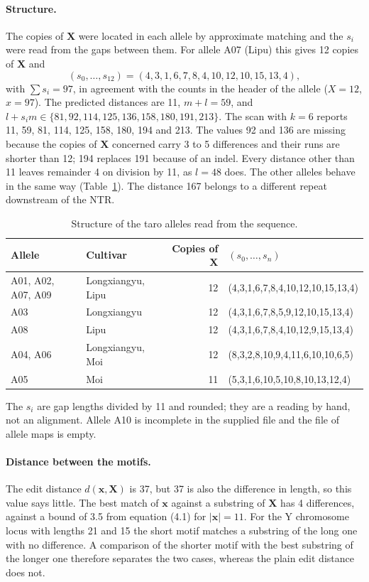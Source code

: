 \documentclass[11pt,a4paper]{article}
\begin{document}
\paragraph{Structure.} The copies of $\mathbf{X}$ were located in each allele
by approximate matching and the $s_i$ were read from the gaps between them.
For allele A07 (Lipu) this gives 12 copies of $\mathbf{X}$ and
\[(s_0,\ldots,s_{12})=(4,3,1,6,7,8,4,10,12,10,15,13,4),\]
with $\sum s_i=97$, in agreement with the counts in the header of the allele
($X=12$, $x=97$). The predicted distances are 11, $m+l=59$, and
$l+s_im\in\{81,92,114,125,136,158,180,191,213\}$. The scan with $k=6$ reports
11, 59, 81, 114, 125, 158, 180, 194 and 213. The values 92 and 136 are missing
because the copies of $\mathbf{X}$ concerned carry 3 to 5 differences and their
runs are shorter than 12; 194 replaces 191 because of an indel. Every distance
other than 11 leaves remainder 4 on division by 11, as $l=48$ does. The other
alleles behave in the same way (Table~\ref{tab:taroalleles}). The distance 167
belongs to a different repeat downstream of the NTR.

\begin{table}[h]\centering
\caption{Structure of the taro alleles read from the sequence.}\label{tab:taroalleles}
\begin{tabular}{llrl}
\toprule
Allele & Cultivar & Copies of $\mathbf{X}$ & $(s_0,\ldots,s_n)$ \\
\midrule
A01, A02, A07, A09 & Longxiangyu, Lipu & 12 & (4,3,1,6,7,8,4,10,12,10,15,13,4) \\
A03 & Longxiangyu & 12 & (4,3,1,6,7,8,5,9,12,10,15,13,4) \\
A08 & Lipu & 12 & (4,3,1,6,7,8,4,10,12,9,15,13,4) \\
A04, A06 & Longxiangyu, Moi & 12 & (8,3,2,8,10,9,4,11,6,10,10,6,5) \\
A05 & Moi & 11 & (5,3,1,6,10,5,10,8,10,13,12,4) \\
\bottomrule
\end{tabular}

\smallskip
{\footnotesize The $s_i$ are gap lengths divided by 11 and rounded; they are a
reading by hand, not an alignment. Allele A10 is incomplete in the supplied
file and the file of allele maps is empty.}
\end{table}

\paragraph{Distance between the motifs.} The edit distance
$d(\mathbf{x},\mathbf{X})$ is 37, but 37 is also the difference in length, so
this value says little. The best match of $\mathbf{x}$ against a substring of
$\mathbf{X}$ has 4 differences, against a bound of 3.5 from equation (4.1) for
$|\mathbf{x}|=11$. For the Y chromosome locus with lengths 21 and 15 the short
motif matches a substring of the long one with no difference. A comparison of
the shorter motif with the best substring of the longer one therefore separates
the two cases, whereas the plain edit distance does not.
\end{document}
